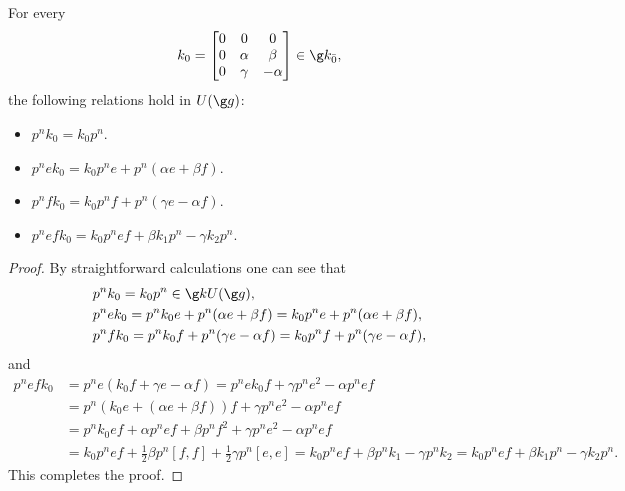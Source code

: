 \documentclass[11pt]{amsart}
\begin{document}
\begin{lem}\label{firstpart}
For every 
\[k_0=\begin{bmatrix}
0&0&0\\
0&\alpha&\beta\\
0&\gamma&-\alpha
\end{bmatrix}
\in \g k_{\bar{0}},
\] the following relations hold in $U(\g g)$:
\begin{itemize}
\item[\rm (i)] 
$p^nk_0=k_0p^n$.
\item[\rm (ii)]
$p^nek_0=k_0p^ne+p^n(\alpha e+\beta f)$.
\item[\rm (iii)] $p^nfk_0=k_0p^nf+p^n(\gamma e-\alpha f)$.
\item[\rm (iv)] $p^nefk_0=k_0p^nef+\beta k_1 p^n-\gamma k_2 p^n$.
\end{itemize}
\end{lem}
\begin{proof}
By straightforward calculations one can see that
\begin{align*}
 &p^nk_0=k_0p^n\in \g k U(\g g),\\
 &p^nek_0=p^nk_0e+p^n(\alpha e+\beta f)=k_0p^ne+p^n(\alpha e+\beta f),\\
 &p^nfk_0=p^nk_0f+p^n(\gamma e-\alpha f)=k_0p^nf+p^n(\gamma e-\alpha f),
\end{align*}
and
\begin{align*}
 p^nefk_0&=p^ne(k_0f+\gamma e-\alpha f)=p^nek_0f+\gamma p^ne^2-\alpha p^n ef\\
&=p^n(k_0e+(\alpha e+\beta f))f+\gamma p^ne^2-\alpha p^n ef\\
&=p^nk_0ef+\alpha p^nef+\beta p^nf^2+\gamma p^ne^2-\alpha p^n ef\\
&=k_0p^nef+\frac{1}{2}\beta p^n[f,f]+\frac{1}{2}\gamma p^n[e,e]=k_0p^nef+\beta p^nk_1-\gamma p^nk_2=k_0p^nef+\beta k_1 p^n-\gamma k_2 p^n.
\end{align*}
This completes the proof.\end{proof}
\end{document}
